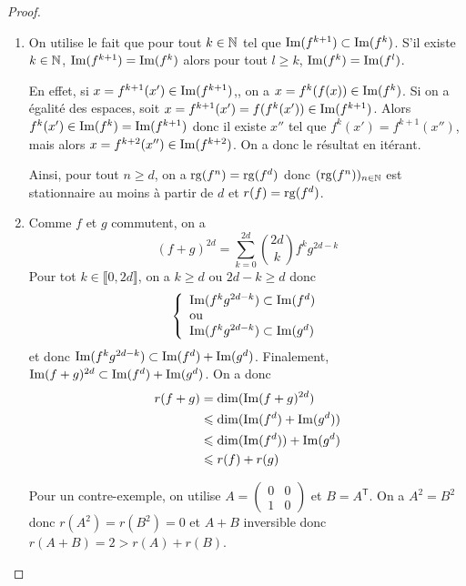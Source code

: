\documentclass[12pt]{article}
\begin{document}
\begin{proof}
	\phantom{}
	\begin{enumerate}
		\item On utilise le fait que pour tout $k\in\mathbb{N}$ tel que $\mathrm{Im}(f^{k+1})\subset\mathrm{Im}(f^{k})$. S'il existe $k\in\mathbb{N}$, $\mathrm{Im}(f^{k+1})=\mathrm{Im}(f^{k})$ alors pour tout $l\geqslant k$, $\mathrm{Im}(f^{k})=\mathrm{Im}(f^{l})$. 

		En effet, si $x=f^{k+1}(x')\in\mathrm{Im}(f^{k+1})$,, on a $x=f^{k}(f(x))\in\mathrm{Im}(f^{k})$. Si on a égalité des espaces, soit $x=f^{k+1}(x')=f(f^{k}(x'))\in\mathrm{Im}(f^{k+1})$. Alors $f^{k}(x')\in\mathrm{Im}(f^{k})=\mathrm{Im}(f^{k+1})$ donc il existe $x''$ tel que $f^{k}(x')=f^{k+1}(x'')$, mais alors $x=f^{k+2}(x'')\in\mathrm{Im}(f^{k+2})$. On a donc le résultat en itérant.

		Ainsi, pour tout $n\geqslant d$, on a $\operatorname{rg}(f^{n})=\operatorname{rg}(f^{d})$ donc $(\operatorname{rg}(f^{n}))_{n\in\mathbb{N}}$ est stationnaire au moins à partir de $d$ et $r(f)=\operatorname{rg}(f^{d})$.

		\item Comme $f$ et $g$ commutent, on a 
		\begin{equation}
			(f+g)^{2d}=\sum_{k=0}^{2d}\binom{2d}{k}f^{k}g^{2d-k}
		\end{equation}
		Pour tot $k\in\llbracket0,2d\rrbracket$, on a $k\geqslant d$ ou $2d-k\geqslant d$ donc 
		\begin{equation}
			\left\lbrace
				\begin{array}[]{l}
					\im(f^{k}g^{2d-k})\subset\im(f^{d})\\
					\text{ou}\\
					\im(f^{k}g^{2d-k})\subset\im(g^{d})
				\end{array}
			\right.
		\end{equation}
		et donc $\mathrm{Im}(f^{k}g^{2d-k})\subset\mathrm{Im}(f^{d})+\mathrm{Im}(g^{d})$. Finalement, $\mathrm{Im}(f+g)^{2d}\subset\mathrm{Im}(f^{d})+\mathrm{Im}(g^{d})$. On a donc 
		\begin{align}
			r(f+g)
			&=\dim(\mathrm{Im}(f+g)^{2d})\\
			&\leqslant \dim(\mathrm{Im}(f^{d})+\mathrm{Im}(g^{d}))\\
			&\leqslant \dim(\mathrm{Im}(f^{d}))+\mathrm{Im}(g^{d})\\
			&\leqslant r(f)+r(g)
		\end{align}

		Pour un contre-exemple, on utilise $A=\begin{pmatrix}
			0&0\\1&0
		\end{pmatrix}$ et $B=A^{\mathsf{T}}$. On a $A^{2}=B^{2}$ donc $r(A^{2})=r(B^{2})=0$ et $A+B$ inversible donc $r(A+B)=2>r(A)+r(B)$.


\end{enumerate}
\end{proof}
\end{document}

